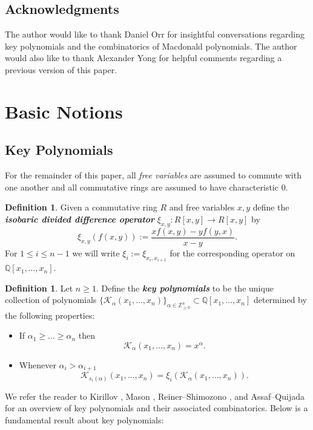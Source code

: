 \documentclass[12pt,reqno]{amsart}
\theoremstyle{definition}
\newtheorem{defn}[thm]{Definition}
\begin{document}
\subsection{Acknowledgments}
The author would like to thank Daniel Orr for insightful conversations regarding key polynomials and the combinatorics of Macdonald polynomials. The author would also like to thank Alexander Yong for helpful comments regarding a previous version of this paper.


\section{Basic Notions}



\subsection{Key Polynomials}

For the remainder of this paper, all \textit{free variables} are assumed to commute with one another and all commutative rings are assumed to have characteristic $0.$

\begin{defn}
Given a commutative ring $R$ and free variables $x,y$ define the \textbf{\textit{isobaric divided difference operator}} $\xi_{x,y}: R[x,y] \rightarrow R[x,y]$ by 
$$\xi_{x,y}(f(x,y)):= \frac{xf(x,y)-yf(y,x)}{x-y}.$$ For $1\leq i \leq n-1$ we will write $\xi_{i}:= \xi_{x_i,x_{i+1}}$ for the corresponding operator on $\mathbb{Q}[x_1,\ldots,x_n].$
\end{defn}


\begin{defn}\cite{Dem_1974}
    Let $n \geq 1$. Define the \textbf{\textit{key polynomials}} to be the unique collection of polynomials $\{\mathcal{K}_{\alpha}(x_1,\ldots, x_n) \}_{\alpha \in \mathbb{Z}_{\geq 0}^{n}} \subset \mathbb{Q}[x_1,\ldots,x_n]$ determined by the following properties:
    \begin{itemize}
        \item If $\alpha_1 \geq \ldots \geq \alpha_n$ then 
        $$\mathcal{K}_{\alpha}(x_1,\ldots, x_n)= x^{\alpha}.$$
        \item Whenever $\alpha_i > \alpha_{i+1}$
        $$\mathcal{K}_{s_i(\alpha)}(x_1,\ldots, x_n) = \xi_{i}(\mathcal{K}_{\alpha}(x_1,\ldots, x_n)).$$
    \end{itemize}
\end{defn}

We refer the reader to Kirillov \cite{Kirillov_2016}, Mason \cite{mason_2009}, Reiner--Shimozono \cite{RS95}, and Assaf--Quijada \cite{AQ19} for an overview of key polynomials and their associated combinatorics. Below is a fundamental result about key polynomials:
\end{document}
